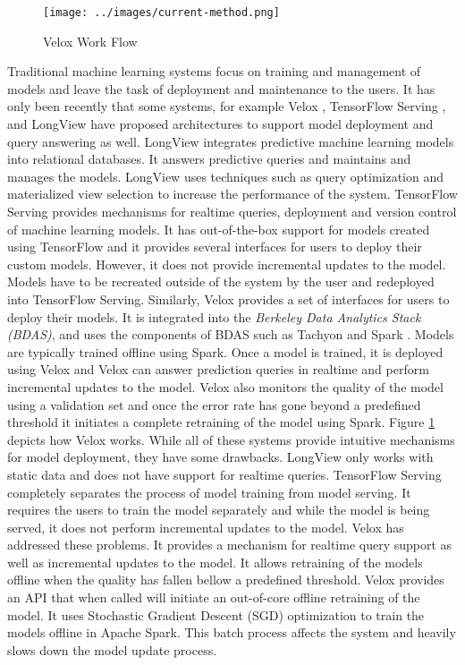 \documentclass{sig-alternate-05-2015}
\begin{document}
\begin{figure}[t]
\centering
\texttt{[image: ../images/current-method.png]}
\caption{Velox Work Flow}
\label{fig:velox-work-flow}
\end{figure}

Traditional machine learning systems focus on training and management of models and leave the task of deployment and maintenance to the users. 
It has only been recently that some systems, for example Velox \cite{crankshaw2014missing}, TensorFlow Serving \cite{abadi2016tensorflow}, and LongView \cite{akdere2011case} have proposed architectures to support model deployment and query answering as well. 
LongView integrates predictive machine learning models into relational databases. 
It answers predictive queries and maintains and manages the models.
LongView uses techniques such as query optimization and materialized view selection to increase the performance of the system.
TensorFlow Serving provides mechanisms for realtime queries, deployment and version control of machine learning models.
It has out-of-the-box support for models created using TensorFlow and it provides several interfaces for users to deploy their custom models.
However, it does not provide incremental updates to the model.
Models have to be recreated outside of the system by the user and redeployed into TensorFlow Serving.
Similarly, Velox provides a set of interfaces for users to deploy their models. 
It is integrated into the \textit{Berkeley Data Analytics Stack (BDAS)}, and uses the components of BDAS such as Tachyon \cite{li2014tachyon} and Spark \cite{zaharia2010spark}. 
Models are typically trained offline using Spark. 
Once a model is trained, it is deployed using Velox and Velox can answer prediction queries in realtime and perform incremental updates to the model.
Velox also monitors the quality of the model using a validation set and once the error rate has gone beyond a predefined threshold it initiates a complete retraining of the model using Spark. 
Figure \ref{fig:velox-work-flow} depicts how Velox works. 
While all of these systems provide intuitive mechanisms for model deployment, they have some drawbacks. 
LongView only works with static data and does not have support for realtime queries.
TensorFlow Serving completely separates the process of model training from model serving. 
It requires the users to train the model separately and while the model is being served, it does not perform incremental updates to the model.
Velox has addressed these problems. 
It provides a mechanism for realtime query support as well as incremental updates to the model.
It allows retraining of the models offline when the quality has fallen bellow a predefined threshold.
Velox provides an API that when called will initiate an out-of-core offline retraining of the model.
It uses Stochastic Gradient Descent (SGD) optimization to train the models offline in Apache Spark.
This batch process affects the system and heavily slows down the model update process.
\end{document}
